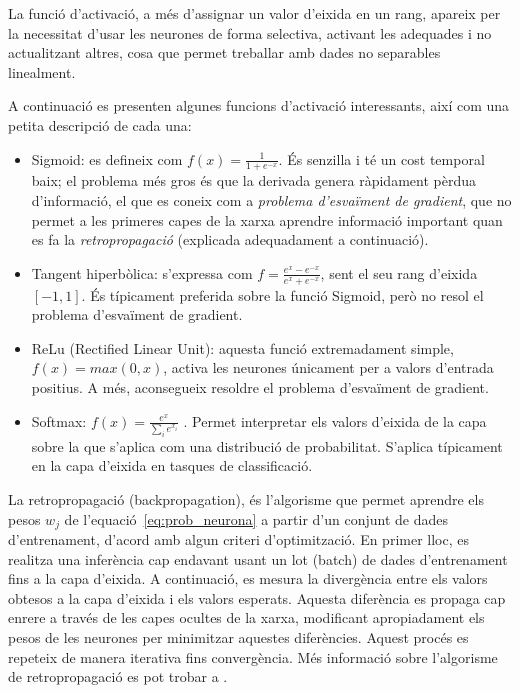La funció d'activació, a més d'assignar un valor d'eixida en un rang, apareix per la necessitat d'usar les neurones de forma selectiva, activant les adequades i no actualitzant altres, cosa que permet treballar amb dades no separables linealment.

A continuació es presenten algunes funcions d'activació interessants, així com una petita descripció de cada una:
\begin{itemize}
    \item Sigmoid: es defineix com $f(x)=\frac{1}{1+e^{-x}}$. És senzilla i té un cost temporal baix; el problema més gros és que la derivada genera ràpidament pèrdua d'informació, el que es coneix com a \textit{problema d'esvaïment de gradient}, que no permet a les primeres capes de la xarxa aprendre informació important quan es fa la \textit{retropropagació} (explicada adequadament a continuació).
    \item Tangent hiperbòlica: s'expressa com $f=\frac{e^x-e^{-x}}{e^x+e^{-x}}$, sent el seu rang d'eixida $[-1, 1]$. És típicament preferida sobre la funció Sigmoid, però no resol el problema d'esvaïment de gradient.
    \item ReLu (Rectified Linear Unit): aquesta funció extremadament simple, $f(x)=max(0, x)$, activa les neurones únicament per a valors d'entrada positius. A més, aconsegueix resoldre el problema d'esvaïment de gradient.
    \item Softmax: $f(x)=\frac{e^x}{\sum_i e^{x_i}}$ . Permet interpretar els valors d'eixida de la capa sobre la que s'aplica com una distribució de probabilitat. S'aplica típicament en la capa d'eixida en tasques de classificació.
\end{itemize}

La retropropagació (backpropagation), és l'algorisme que permet aprendre els pesos $w_j$ de l'equació~\ref{eq:prob_neurona} a partir d'un conjunt de dades d'entrenament, d'acord amb algun criteri d'optimització.
En primer lloc, es realitza una inferència cap endavant usant un lot (batch) de dades d'entrenament fins a la capa d'eixida. A continuació, es mesura la divergència entre els valors obtesos a la capa d'eixida i els valors esperats. Aquesta diferència es propaga cap enrere a través de les capes ocultes de la xarxa, modificant apropiadament els pesos de les neurones per minimitzar aquestes diferències. Aquest procés es repeteix de manera iterativa fins convergència. 
Més informació sobre l'algorisme de retropropagació es pot trobar a \cite{rumelhart1986backpropagation}.

